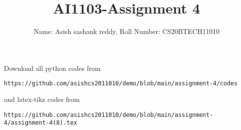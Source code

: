 \documentclass[journal,12pt,twocolumn]{IEEEtran}
\DeclareMathOperator*{\Res}{Res}
\begin{document}
\newcommand{\BEQA}{\begin{eqnarray}}
\newcommand{\EEQA}{\end{eqnarray}}
\newcommand{\define}{\stackrel{\triangle}{=}}

\raggedbottom
\setlength{\parindent}{0pt}
\providecommand{\mbf}{\mathbf}
\providecommand{\pr}[1]{\ensuremath{\Pr\left(#1\right)}}
\providecommand{\qfunc}[1]{\ensuremath{Q\left(#1\right)}}
\providecommand{\sbrak}[1]{\ensuremath{{}\left[#1\right]}}
\providecommand{\lsbrak}[1]{\ensuremath{{}\left[#1\right.}}
\providecommand{\rsbrak}[1]{\ensuremath{{}\left.#1\right]}}
\providecommand{\brak}[1]{\ensuremath{\left(#1\right)}}
\providecommand{\lbrak}[1]{\ensuremath{\left(#1\right.}}
\providecommand{\rbrak}[1]{\ensuremath{\left.#1\right)}}
\providecommand{\cbrak}[1]{\ensuremath{\left\{#1\right\}}}
\providecommand{\lcbrak}[1]{\ensuremath{\left\{#1\right.}}
\providecommand{\rcbrak}[1]{\ensuremath{\left.#1\right\}}}
\theoremstyle{remark}
\newtheorem{rem}{Remark}
\newcommand{\sgn}{\mathop{\mathrm{sgn}}}
\providecommand{\abs}[1]{\vert#1\vert}
\providecommand{\res}[1]{\Res\displaylimits_{#1}} 
\providecommand{\norm}[1]{\lVert#1\rVert}
\providecommand{\mtx}[1]{\mathbf{#1}}
\providecommand{\mean}[1]{E[ #1 ]}
\providecommand{\fourier}{\overset{\mathcal{F}}{ \rightleftharpoons}}
\providecommand{\system}{\overset{\mathcal{H}}{ \longleftrightarrow}}
\newcommand{\solution}{\noindent \textbf{Solution: }}
\newcommand{\cosec}{\,\text{cosec}\,}
\providecommand{\dec}[2]{\ensuremath{\overset{#1}{\underset{#2}{\gtrless}}}}
\newcommand{\myvec}[1]{\ensuremath{\begin{pmatrix}#1\end{pmatrix}}}
\newcommand{\mydet}[1]{\ensuremath{\begin{vmatrix}#1\end{vmatrix}}}
\makeatletter
{}
\makeatother
\let\StandardTheFigure\thefigure
\let\vec\mathbf
\renewcommand{\thefigure}{\theproblem}
\def\putbox#1#2#3{\makebox[0in][l]{\makebox[#1][l]{}\raisebox{\baselineskip}[0in][0in]{\raisebox{#2}[0in][0in]{#3}}}}
     \def\rightbox#1{\makebox[0in][r]{#1}}
     \def\centbox#1{\makebox[0in]{#1}}
     \def\topbox#1{\raisebox{-\baselineskip}[0in][0in]{#1}}
     \def\midbox#1{\raisebox{-0.5\baselineskip}[0in][0in]{#1}}
\vspace{3cm}
\title{AI1103-Assignment 4}
\author{Name: Asish sashank reddy, Roll Number: CS20BTECH11010}
\maketitle
\newpage
\bigskip
\renewcommand{\thefigure}{\theenumi}
\renewcommand{\thetable}{\theenumi}
Download all python codes from 
\begin{lstlisting}
https://github.com/asishcs2011010/demo/blob/main/assignment-4/codes
\end{lstlisting}
%
and latex-tikz codes from 
%
\begin{lstlisting}
https://github.com/asishcs2011010/demo/blob/main/assignment-4/assignment-4(8).tex 
\end{lstlisting}
\end{document}
